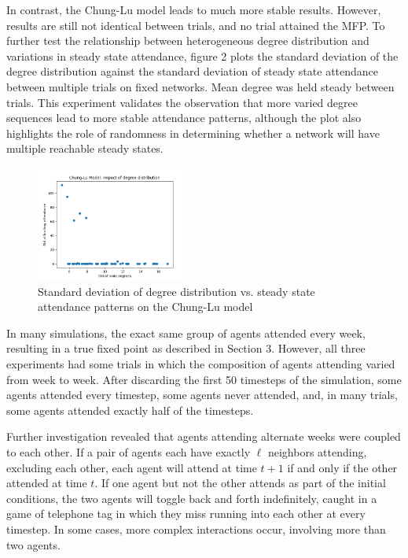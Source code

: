 \documentclass[12pt]{article}
\begin{document}
In contrast, the Chung-Lu model leads to much more stable results.  However, results are still not identical between trials, and no trial attained the MFP.  To further test the relationship between heterogeneous degree distribution and variations in steady state attendance, figure 2 plots the standard deviation of the degree distribution against the standard deviation of steady state attendance between multiple trials on fixed networks.  Mean degree was held steady between trials.  This experiment validates the observation that more varied degree sequences lead to more stable attendance patterns, although the plot also highlights the role of randomness in determining whether a network will have multiple reachable steady states.

\begin{figure}
  \includegraphics[width=0.45\textwidth]{chung_lu_std.png}
  \caption{Standard deviation of degree distribution vs. steady state attendance patterns on the Chung-Lu model}
\end{figure}

In many simulations, the exact same group of agents attended every week, resulting in a true fixed point as described in Section 3.  However, all three experiments had some trials in which the composition of agents attending varied from week to week.  After discarding the first 50 timesteps of the simulation, some agents attended every timestep, some agents never attended, and, in many trials, some agents attended exactly half of the timesteps.

Further investigation revealed that agents attending alternate weeks were coupled to each other.  If a pair of agents each have exactly $\ell$ neighbors attending, excluding each other, each agent will attend at time $t+1$ if and only if the other attended at time $t$.  If one agent but not the other attends as part of the initial conditions, the two agents will toggle back and forth indefinitely, caught in a game of telephone tag in which they miss running into each other at every timestep.  In some cases, more complex interactions occur, involving more than two agents.
\end{document}
